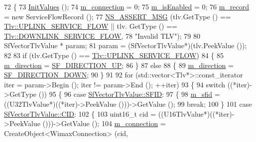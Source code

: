 \begin{DoxyCode}
72 \{
73   \hyperlink{classns3_1_1ServiceFlow_ab0033129ef33dbf04faa2bc98c179f4f}{InitValues} ();
74   \hyperlink{classns3_1_1ServiceFlow_a5655fd21757cc55c16943c453bad928d}{m\_connection} = 0;
75   \hyperlink{classns3_1_1ServiceFlow_a4ae8c3beb9b40872267e6fb6e6c61c84}{m\_isEnabled} = 0;
76   \hyperlink{classns3_1_1ServiceFlow_aa35cc96a2815d89663d87b612e61bb3e}{m\_record} = \textcolor{keyword}{new} ServiceFlowRecord ();
77   \hyperlink{assert_8h_aff5ece9066c74e681e74999856f08539}{NS\_ASSERT\_MSG} (tlv.GetType () == \hyperlink{classns3_1_1Tlv_ab275ea003645d46aada8e2b351de90e3a3b5488fc87cf6e32674c512bbf6bbb84}{Tlv::UPLINK\_SERVICE\_FLOW} || tlv.
      GetType () == \hyperlink{classns3_1_1Tlv_ab275ea003645d46aada8e2b351de90e3a75b57001056f0b9395e079873cb38f1d}{Tlv::DOWNLINK\_SERVICE\_FLOW},
78                  \textcolor{stringliteral}{"Invalid TLV"});
79 
80   SfVectorTlvValue * param;
81   param = (SfVectorTlvValue*)(tlv.PeekValue ());
82 
83   \textcolor{keywordflow}{if} (tlv.GetType () == \hyperlink{classns3_1_1Tlv_ab275ea003645d46aada8e2b351de90e3a3b5488fc87cf6e32674c512bbf6bbb84}{Tlv::UPLINK\_SERVICE\_FLOW})
84     \{
85       \hyperlink{classns3_1_1ServiceFlow_aeadd654a7d1e5e6c64b6702fecc289dd}{m\_direction} = \hyperlink{classns3_1_1ServiceFlow_ae14b8dc8bb371bad10fe078110655d4fadbdc2e453d8d7a126f89ecedca018714}{SF\_DIRECTION\_UP};
86     \}
87   \textcolor{keywordflow}{else}
88     \{
89       \hyperlink{classns3_1_1ServiceFlow_aeadd654a7d1e5e6c64b6702fecc289dd}{m\_direction} = \hyperlink{classns3_1_1ServiceFlow_ae14b8dc8bb371bad10fe078110655d4fa14cabffe872245d876df31d3f63fc8b2}{SF\_DIRECTION\_DOWN};
90     \}
91 
92   \textcolor{keywordflow}{for} (std::vector<Tlv*>::const\_iterator iter = param->Begin (); iter != param->End (); ++iter)
93     \{
94       \textcolor{keywordflow}{switch} ((*iter)->GetType ())
95         \{
96         \textcolor{keywordflow}{case} \hyperlink{classns3_1_1SfVectorTlvValue_aa23ab5c7acfce609dbfe28024c6d2ef7a3a1c1c00258b4efc6901ef23b75eef56}{SfVectorTlvValue::SFID}:
97           \{
98             \hyperlink{classns3_1_1ServiceFlow_ae39adff3ec14a28fc308208e56de4f82}{m\_sfid} = ((U32TlvValue*)((*iter)->PeekValue ()))->GetValue ();
99             \textcolor{keywordflow}{break};
100           \}
101         \textcolor{keywordflow}{case} \hyperlink{classns3_1_1SfVectorTlvValue_aa23ab5c7acfce609dbfe28024c6d2ef7a1627638d4b6c39280f4e94afe1faea61}{SfVectorTlvValue::CID}:
102           \{
103             uint16\_t cid = ((U16TlvValue*)((*iter)->PeekValue ()))->GetValue ();
104             \hyperlink{classns3_1_1ServiceFlow_a5655fd21757cc55c16943c453bad928d}{m\_connection} = CreateObject<WimaxConnection> (cid, 

\end{DoxyCode}
